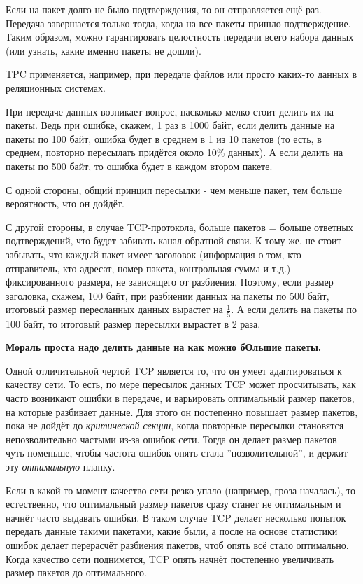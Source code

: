 Если на пакет долго не было подтверждения, то он отправляется ещё раз. Передача завершается только тогда, когда на все пакеты пришло подтверждение. Таким образом, можно гарантировать целостность передачи всего набора данных (или узнать, какие именно пакеты не дошли).

TPC применяется, например, при передаче файлов или просто каких-то данных в реляционных системах.

\bigskip
При передаче данных возникает вопрос, насколько мелко стоит делить их на пакеты. Ведь при ошибке, скажем, 1 раз в 1000 байт, если делить данные на пакеты по 100 байт, ошибка будет в среднем в 1 из 10 пакетов (то есть, в среднем, повторно пересылать придётся около 10\% данных). А если делить на пакеты по 500 байт, то ошибка будет в каждом втором пакете.

С одной стороны, общий принцип пересылки - чем меньше пакет, тем больше вероятность, что он дойдёт. 

С другой стороны, в случае TCP-протокола, больше пакетов = больше ответных подтверждений, что будет забивать канал обратной связи. К тому же, не стоит забывать, что каждый пакет имеет заголовок (информация о том, кто отправитель, кто адресат, номер пакета, контрольная сумма и т.д.) фиксированного размера, не зависящего от разбиения. Поэтому, если размер заголовка, скажем, 100 байт, при разбиении данных на пакеты по 500 байт, итоговый размер пересланных данных вырастет на $\frac{1}{5}$. А если делить на пакеты по 100 байт, то итоговый размер пересылки вырастет в 2 раза.

\textbf{Мораль проста надо делить данные на как можно бОльшие пакеты.}

Одной отличительной чертой TCP является то, что он умеет адаптироваться к качеству сети. То есть, по мере пересылок данных TCP может просчитывать, как часто возникают ошибки в передаче, и варьировать оптимальный размер пакетов, на которые разбивает данные. Для этого он постепенно повышает размер пакетов, пока не дойдёт до \textit{критической секции}, когда повторные пересылки становятся непозволительно частыми из-за ошибок сети. Тогда он делает размер пакетов чуть поменьше, чтобы частота ошибок опять стала ''позволительной'', и держит эту \textit{оптимальную} планку.

Если в какой-то момент качество сети резко упало (например, гроза началась), то естественно, что оптимальный размер пакетов сразу станет не оптимальным и начнёт часто выдавать ошибки. В таком случае TCP делает несколько попыток передать данные такими пакетами, какие были, а после на основе статистики ошибок делает перерасчёт разбиения пакетов, чтоб опять всё стало оптимально. Когда качество сети поднимется, TCP опять начнёт постепенно увеличивать размер пакетов до оптимального.

